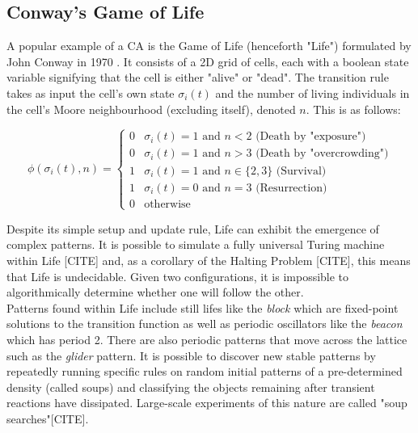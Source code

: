 \subsection{Conway's Game of Life} \label{sub:life}
A popular example of a CA is the Game of Life (henceforth "Life") formulated by John Conway in 1970 \cite{gardner1970fantastic}. It consists of a 2D grid of cells, each with a boolean state variable signifying that the cell is either "alive" or "dead". The transition rule takes as input the cell's own state $\sigma_i(t)$ and the number of living individuals in the cell's Moore neighbourhood (excluding itself), denoted $n$. This is as follows:

\begin{equation}
  \phi(\sigma_i(t), n) = 
\begin{cases}
  0 & \sigma_i(t) = 1 \text{ and } n < 2 \text{  (Death by "exposure")}\\
  0 & \sigma_i(t) = 1 \text{ and } n > 3 \text{  (Death by "overcrowding")}\\
  1 & \sigma_i(t) = 1 \text{ and } n \in \{2,3\} \text{  (Survival)}\\
  1 & \sigma_i(t) = 0 \text{ and } n = 3 \text{  (Resurrection)}\\
  0 & \text{otherwise}
\end{cases}
\end{equation}

Despite its simple setup and update rule, Life can exhibit the emergence of complex patterns. It is possible to simulate a fully universal Turing machine within Life [CITE] and, as a corollary of the Halting Problem [CITE], this means that Life is undecidable. Given two configurations, it is impossible to algorithmically determine whether one will follow the other.\\

Patterns found within Life include still lifes like the \textit{block} which are fixed-point solutions to the transition function as well as periodic oscillators like the \textit{beacon} which has period 2. There are also periodic patterns that move across the lattice such as the \textit{glider} pattern. It is possible to discover new stable patterns by repeatedly running specific rules on random initial patterns of a pre-determined density (called soups) and classifying the objects remaining after transient reactions have dissipated. Large-scale experiments of this nature are called "soup searches"[CITE].\\

